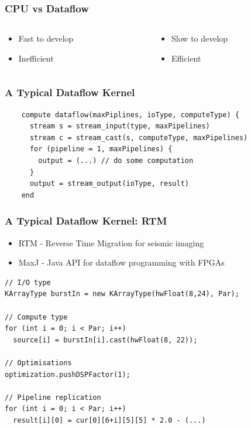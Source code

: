 \begin{frame}
  \frametitle{CPU vs Dataflow}
  \begin{columns}
    \begin{column}{.5\linewidth}
      \begin{figure}[!ht]
        \centering
        \def\svgwidth{\linewidth}
        
      \end{figure}
      \begin{itemize}
      \item Fast to develop
      \item Inefficient
      \end{itemize}
    \end{column}
    \begin{column}{.5\linewidth}
      \begin{figure}[!ht]
        \centering
        \def\svgwidth{\linewidth}
        
      \end{figure}
      \begin{itemize}
      \item Slow to develop
      \item Efficient
      \end{itemize}
    \end{column}
  \end{columns}
\end{frame}

\begin{frame}[fragile]
  \frametitle{A Typical Dataflow Kernel}
  \begin{lstlisting}
    compute dataflow(maxPiplines, ioType, computeType) {
      stream s = stream_input(type, maxPipelines)
      stream c = stream_cast(s, computeType, maxPipelines)
      for (pipeline = 1, maxPipelines) {
        output = (...) // do some computation
      }
      output = stream_output(ioType, result)
    end
  \end{lstlisting}
\end{frame}

\begin{frame}[fragile]
  \frametitle{A Typical Dataflow Kernel: RTM}
  \begin{itemize}
    \item RTM - Reverse Time Migration for seismic imaging
    \item MaxJ - Java API for dataflow programming with FPGAs
  \end{itemize}

  \begin{lstlisting}
// I/O type
KArrayType burstIn = new KArrayType(hwFloat(8,24), Par);

// Compute type
for (int i = 0; i < Par; i++)
  source[i] = burstIn[i].cast(hwFloat(8, 22));

// Optimisations
optimization.pushDSPFactor(1);

// Pipeline replication
for (int i = 0; i < Par; i++)
  result[i][0] = cur[0][6+i][5][5] * 2.0 - (...)
\end{lstlisting}
\end{frame}

